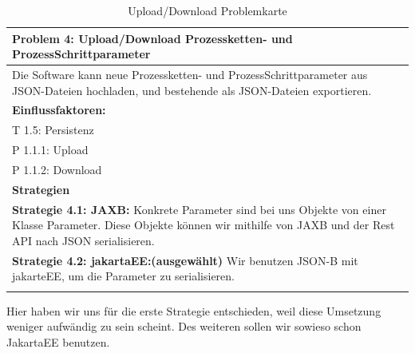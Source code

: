 \documentclass[enabledeprecatedfontcommands,fontsize=12pt,paper=a4,twoside]{scrartcl}
\begin{document}
\begin{table}[H]
    \centering
    \begin{tabular}{|p{15cm}|}
    \hline
          \textbf{Problem 4:} Upload/Download Prozessketten- und ProzessSchrittparameter \\ \hline
          Die Software kann neue Prozessketten- und ProzessSchrittparameter aus JSON-Dateien hochladen, und bestehende als JSON-Dateien exportieren.
          \\ \hline
          \textbf{Einflussfaktoren: } \\
          T 1.5: Persistenz \\
          P 1.1.1: Upload\\
          P 1.1.2: Download\\
          \hline
          \textbf{Strategien} \\ \hline
          \textbf{Strategie 4.1: JAXB:}  Konkrete Parameter sind bei uns Objekte von einer Klasse Parameter. Diese Objekte können wir mithilfe von JAXB und der Rest API nach JSON serialisieren. \\ 
          \textbf{Strategie 4.2: jakartaEE:(ausgewählt)} Wir benutzen JSON-B mit jakarteEE, um die Parameter zu serialisieren. \\
          \\ \hline
    \end{tabular}
    \caption{Upload/Download Problemkarte}
    \label{tab:ProblemKarte4}
\end{table}
Hier haben wir uns für die erste Strategie entschieden, weil diese Umsetzung weniger aufwändig zu sein scheint. Des weiteren sollen wir sowieso schon JakartaEE benutzen. \\
\end{document}
